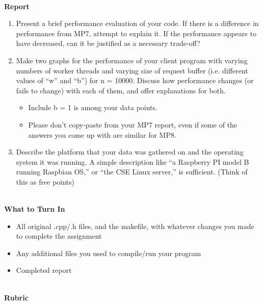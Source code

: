 \documentclass[12pt]{extarticle}
\newenvironment{myindentpar}[1]%
 {\begin{list}{}%
         {\setlength{\leftmargin}{#1}}%
         \item[]%
 }
 {\end{list}}
\begin{document}
\begin{myindentpar}{5mm}
	\ \\
    \textbf{Report}	

	\begin{enumerate}
		\setlength\itemsep{-0.1em}
		\item Present a brief performance evaluation of your code. If there is a difference in performance from MP7, attempt to explain it. If the performance appears to have decreased, can it be justified as a necessary trade-off?
		\item Make two graphs for the performance of your client program with varying numbers of worker threads and varying size of request buffer (i.e. different values of “w” and “b”) for n = 10000. Discuss how performance changes (or fails to change) with each of them, and offer explanations for both.
			\begin{itemize}			
			\setlength\itemsep{-0.1em}
				\item Include b = 1 is among your data points.
				\item Please don’t copy-paste from your MP7 report, even if some of the answers you come up with are similar for MP8.
			\end{itemize}
		\item Describe the platform that your data was gathered on and the operating system it was running. A simple description like “a Raspberry PI model B running Raspbian OS,” or “the CSE Linux server,” is sufficient. (Think of this as free points)
	\end{enumerate}

	\ \\
    \textbf{What to Turn In}	

	\begin{itemize}
		\setlength\itemsep{-0.1em}
		\item All original .cpp/.h files, and the makefile, with whatever changes you made to complete the assignment
		\item Any additional files you used to compile/run your program
		\item Completed report
	\end{itemize}

	\ \\
    \textbf{Rubric}	


\end{myindentpar}
\end{document}
